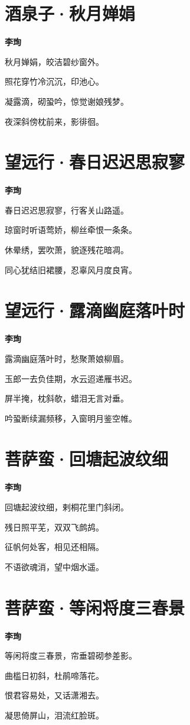 \documentclass[12pt,a4paper]{ctexbook}
\begin{document}
\section{酒泉子·秋月婵娟}
\textbf{李珣}\par\vspace{0.5em}
秋月婵娟，皎洁碧纱窗外。\par
照花穿竹冷沉沉，印池心。\par
凝露滴，砌蛩吟，惊觉谢娘残梦。\par
夜深斜傍枕前来，影徘徊。\par

\section{望远行·春日迟迟思寂寥}
\textbf{李珣}\par\vspace{0.5em}
春日迟迟思寂寥，行客关山路遥。\par
琼窗时听语莺娇，柳丝牵恨一条条。\par
休晕绣，罢吹萧，貌逐残花暗凋。\par
同心犹结旧裙腰，忍辜风月度良宵。\par

\section{望远行·露滴幽庭落叶时}
\textbf{李珣}\par\vspace{0.5em}
露滴幽庭落叶时，愁聚萧娘柳眉。\par
玉郎一去负佳期，水云迢递雁书迟。\par
屏半掩，枕斜欹，蜡泪无言对垂。\par
吟蛩断续漏频移，入窗明月鉴空帷。\par

\section{菩萨蛮·回塘起波纹细}
\textbf{李珣}\par\vspace{0.5em}
回塘起波纹细，剌桐花里门斜闭。\par
残日照平芜，双双飞鹧鸪。\par
征帆何处客，相见还相隔。\par
不语欲魂消，望中烟水遥。\par

\section{菩萨蛮·等闲将度三春景}
\textbf{李珣}\par\vspace{0.5em}
等闲将度三春景，帘垂碧砌参差影。\par
曲槛日初斜，杜鹃啼落花。\par
恨君容易处，又话潇湘去。\par
凝思倚屏山，泪流红脸斑。\par
\end{document}
